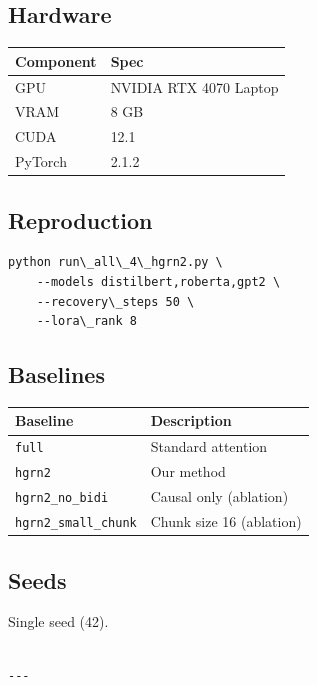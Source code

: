 \subsection{Hardware}

\begin{table}[H]
\centering
\small
\begin{tabular}{ll}
\toprule
\textbf{Component} & \textbf{Spec} \\
\midrule
GPU & NVIDIA RTX 4070 Laptop \\
VRAM & 8 GB \\
CUDA & 12.1 \\
PyTorch & 2.1.2 \\
\bottomrule
\end{tabular}
\end{table}

\subsection{Reproduction}

\begin{lstlisting}
python run\_all\_4\_hgrn2.py \
    --models distilbert,roberta,gpt2 \
    --recovery\_steps 50 \
    --lora\_rank 8
\end{lstlisting}

\subsection{Baselines}

\begin{table}[H]
\centering
\small
\begin{tabular}{ll}
\toprule
\textbf{Baseline} & \textbf{Description} \\
\midrule
\texttt{full} & Standard attention \\
\texttt{hgrn2} & Our method \\
\texttt{hgrn2\_no\_bidi} & Causal only (ablation) \\
\texttt{hgrn2\_small\_chunk} & Chunk size 16 (ablation) \\
\bottomrule
\end{tabular}
\end{table}

\subsection{Seeds}

Single seed (42).
\begin{lstlisting}

---
\end{lstlisting}

